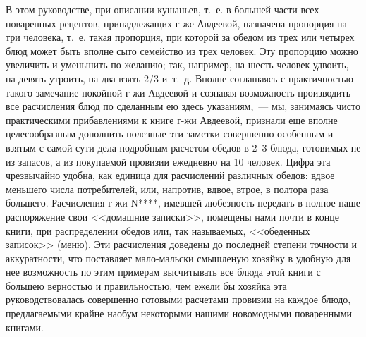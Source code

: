 В этом руководстве, при описании кушаньев, т.~е. в большей части всех поваренных рецептов, принадлежащих г-же Авдеевой, назначена пропорция на три человека, т.~е. такая пропорция, при которой за обедом из трех или четырех блюд может быть вполне сыто семейство из трех человек. Эту пропорцию можно увеличить и уменьшить по желанию; так, например, на шесть человек удвоить, на девять утроить, на два взять 2/3 и~т.~д. Вполне соглашаясь с практичностью такого замечание покойной г-жи Авдеевой и сознавая возможность производить все расчисления блюд по сделанным ею здесь указаниям,~--- мы, занимаясь чисто практическими прибавлениями к книге г-жи Авдеевой, признали еще вполне целесообразным дополнить полезные эти заметки совершенно особенным и взятым с самой сути дела подробным расчетом обедов в 2–3 блюда, готовимых не из запасов, а из покупаемой провизии ежедневно на 10 человек. Цифра эта чрезвычайно удобна, как единица для расчислений различных обедов: вдвое меньшего числа потребителей, или, напротив, вдвое, втрое, в полтора раза большего. Расчисления г-жи N****, имевшей любезность передать в полное наше распоряжение свои <<домашние записки>>, помещены нами почти в конце книги, при распределении обедов или, так называемых, <<обеденных записок>> (меню). Эти расчисления доведены до последней степени точности и аккуратности, что поставляет мало-мальски смышленую хозяйку в удобную для нее возможность по этим примерам высчитывать все блюда этой книги с большею верностью и правильностью, чем ежели бы хозяйка эта руководствовалась совершенно готовыми расчетами провизии на каждое блюдо, предлагаемыми крайне наобум некоторыми нашими новомодными поваренными книгами.
